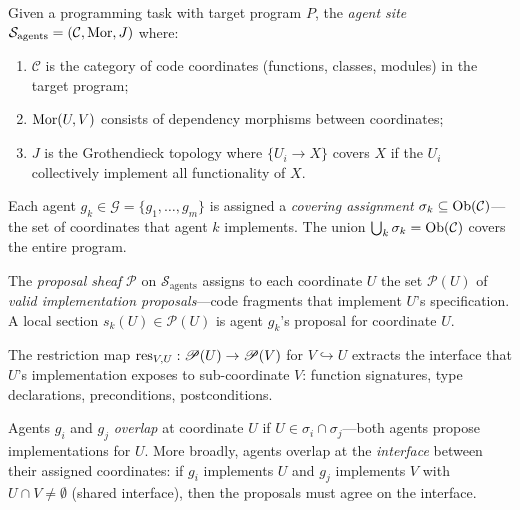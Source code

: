 \documentclass[11pt]{article}
\newcommand{\AgentSet}{\mathcal{G}}
\newcommand{\ProposalSheaf}{\mathscr{P}}
\newcommand{\AgentSite}{\mathcal{S}_{\mathrm{agents}}}
\begin{document}
\begin{definition}\label{def:agent-site}
Given a programming task with target program $P$, the \emph{agent site}
$\AgentSite = (\mathcal{C}, \Mor, J)$ where:
\begin{enumerate}[label=(\alph*)]
  \item $\mathcal{C}$ is the category of code coordinates (functions,
    classes, modules) in the target program;
  \item $\mathrm{Mor}(U, V)$ consists of dependency morphisms between
    coordinates;
  \item $J$ is the Grothendieck topology where $\{U_i \to X\}$ covers
    $X$ if the $U_i$ collectively implement all functionality of $X$.
\end{enumerate}
Each agent $g_k \in \AgentSet = \{g_1, \ldots, g_m\}$ is assigned a
\emph{covering assignment} $\sigma_k \subseteq \mathrm{Ob}(\mathcal{C})$---the
set of coordinates that agent $k$ implements.  The union
$\bigcup_k \sigma_k = \mathrm{Ob}(\mathcal{C})$ covers the entire program.
\end{definition}

\begin{definition}\label{def:proposal-sheaf}
The \emph{proposal sheaf} $\ProposalSheaf$ on $\AgentSite$ assigns to
each coordinate $U$ the set $\ProposalSheaf(U)$ of \emph{valid
implementation proposals}---code fragments that implement $U$'s
specification.  A local section $s_k(U) \in \ProposalSheaf(U)$ is
agent $g_k$'s proposal for coordinate $U$.

The restriction map $\res_{V,U} : \ProposalSheaf(U) \to \ProposalSheaf(V)$
for $V \hookrightarrow U$ extracts the interface that $U$'s implementation
exposes to sub-coordinate $V$: function signatures, type declarations,
preconditions, postconditions.
\end{definition}

\begin{definition}\label{def:agent-overlap}
Agents $g_i$ and $g_j$ \emph{overlap} at coordinate $U$ if
$U \in \sigma_i \cap \sigma_j$---both agents propose implementations
for $U$.  More broadly, agents overlap at the \emph{interface} between
their assigned coordinates: if $g_i$ implements $U$ and $g_j$
implements $V$ with $U \cap V \neq \emptyset$ (shared interface),
then the proposals must agree on the interface.
\end{definition}
\end{document}
